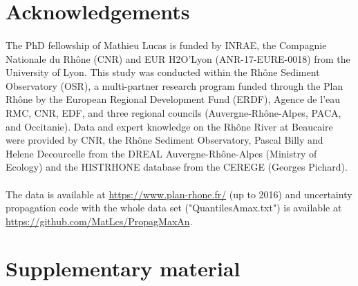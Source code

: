 \documentclass[11pt]{article}
\begin{document}
\section{Acknowledgements}
\paragraph{}
The PhD fellowship of Mathieu Lucas is funded by INRAE, the Compagnie Nationale du Rhône (CNR) and EUR H2O’Lyon (ANR-17-EURE-0018) from the University of Lyon. This study was conducted within the Rhône Sediment Observatory (OSR), a multi-partner research program funded through the Plan Rhône by the European Regional Development Fund (ERDF), Agence de l'eau RMC, CNR, EDF, and three regional councils (Auvergne-Rhône-Alpes, PACA, and Occitanie). Data and expert knowledge on the Rhône River at Beaucaire were provided by CNR, the Rhône Sediment Observatory, Pascal Billy and Helene Decourcelle from the DREAL Auvergne-Rhône-Alpes (Ministry of Ecology) and the HISTRHONE database from the CEREGE (Georges Pichard).
\paragraph{} The data is available at \href{https://www.plan-rhone.fr/publications-131/actualisation-de-lhydrologie-des-crues-du-rhone-1865.html?cHash=5628938abe287dc9ca390dad7373ae0e}{https://www.plan-rhone.fr/} (up to 2016) and uncertainty propagation code with the whole data set ("QuantilesAmax.txt") is available at \url{https://github.com/MatLcs/PropagMaxAn}.

\newpage

\printbibliography

\newpage

\section{Supplementary material}
\label{sec:suppl}
\end{document}
